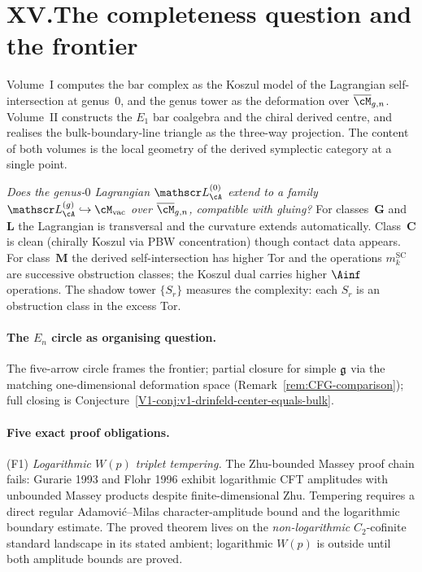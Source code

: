 \section*{XV.\quad The completeness question and the frontier}

Volume~I computes the bar complex as the Koszul model of the
Lagrangian self-intersection at genus~$0$, and the genus tower
as the deformation over $\overline{\cM}_{g,n}$. Volume~II
constructs the $E_1$ bar coalgebra and the chiral derived
centre, and realises the bulk-boundary-line triangle as the
three-way projection. The content of both volumes is the local
geometry of the derived symplectic category at a single point.

\emph{Does the genus-$0$ Lagrangian $\cL_\cA^{(0)}$ extend to a
family $\cL_\cA^{(g)} \hookrightarrow \cM_{\mathrm{vac}}$ over
$\overline{\cM}_{g,n}$, compatible with gluing?} For
classes~$\mathbf{G}$ and~$\mathbf{L}$ the Lagrangian is
transversal and the curvature extends automatically.
Class~$\mathbf{C}$ is clean (chirally Koszul via PBW
concentration) though contact data appears. For
class~$\mathbf{M}$ the derived self-intersection has higher Tor
and the operations $m_k^{\mathrm{SC}}$ are successive
obstruction classes; the Koszul dual carries higher $\Ainf$
operations. The shadow tower $\{S_r\}$ measures the complexity:
each $S_r$ is an obstruction class in the excess Tor.

\paragraph{The $E_n$ circle as organising question.}
The five-arrow circle frames the frontier; partial closure for
simple $\mathfrak{g}$ via the matching one-dimensional deformation space
(Remark~\ref{rem:CFG-comparison}); full closing is
Conjecture~\ref{V1-conj:v1-drinfeld-center-equals-bulk}.

\paragraph{Five exact proof obligations.}

(F1) \emph{Logarithmic $W(p)$ triplet tempering.} The Zhu-bounded
Massey proof chain fails: Gurarie 1993 and Flohr 1996 exhibit
logarithmic CFT amplitudes with unbounded Massey products despite
finite-dimensional Zhu. Tempering requires a direct
regular Adamovi\'c--Milas character-amplitude bound and the logarithmic
boundary estimate. The proved theorem lives on
the \emph{non-logarithmic} $C_2$-cofinite standard landscape in its
stated ambient; logarithmic $W(p)$ is outside until
both amplitude bounds are proved.

